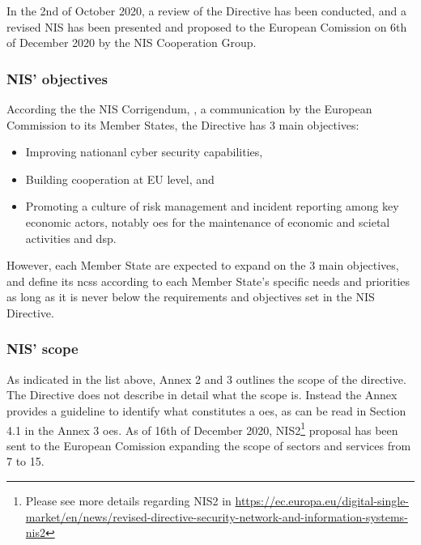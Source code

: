 In the 2nd of October 2020, a review of the Directive has been conducted, and a revised NIS has been presented and proposed to the European Comission on 6th of December 2020 by the NIS Cooperation Group.

\subsubsection{NIS' objectives}
According the the NIS Corrigendum, \cite{EuropeanCommission2017} , a communication by the European Commission to its Member States, the Directive has 3 main objectives:

\begin{itemize}
    \item Improving nationanl cyber security capabilities,
    \item Building cooperation at EU level, and
    \item Promoting a culture of risk management and incident reporting among key economic actors, notably \acrfull{oes} for the maintenance of economic and scietal activities and \acrfull{dsp}.
\end{itemize}

However, each Member State are expected to expand on the 3 main objectives, and define its \acrshort{ncss} according to each Member State's specific needs and priorities as long as it is never below the requirements and objectives set in the NIS Directive.

\subsubsection{NIS' scope}

As indicated in the list above, Annex 2 and 3 outlines the scope of the directive. The Directive does not describe in detail what the scope is. Instead the Annex provides a guideline to identify what constitutes a \acrfull{oes}, as can be read in Section 4.1 in the Annex 3 \acrshort{oes}. As of 16th of December 2020, NIS2\footnote[4]{Please see more details regarding NIS2 in \url{https://ec.europa.eu/digital-single-market/en/news/revised-directive-security-network-and-information-systems-nis2}} proposal has been sent to the European Comission expanding the scope of sectors and services from 7 to 15. 

